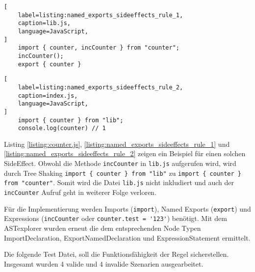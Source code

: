 \begin{lstlisting}[
    label=listing:named_exports_sideeffects_rule_1,
	caption=lib.js,
	language=JavaScript,
]
	import { counter, incCounter } from "counter";
	incCounter();
	export { counter }
\end{lstlisting}

\begin{lstlisting}[
    label=listing:named_exports_sideeffects_rule_2,
	caption=index.js,
	language=JavaScript,
]
	import { counter } from "lib";
	console.log(counter) // 1
\end{lstlisting}

Listing \ref{listing:counter.js}, \ref{listing:named_exports_sideeffects_rule_1} und \ref{listing:named_exports_sideeffects_rule_2} zeigen ein Beispiel für einen solchen SideEffect. Obwohl die Methode \lstinline{incCounter} in \lstinline{lib.js} aufgerufen wird, wird durch Tree Shaking \lstinline|import { counter } from "lib"| zu \lstinline|import { counter } from "counter"|. Somit wird die Datei \lstinline{lib.js} nicht inkludiert und auch der \lstinline{incCounter} Aufruf geht in weiterer Folge verloren.

Für die Implementierung werden Imports (\lstinline{import}), Named Exports  (\lstinline{export}) und Expressions (\lstinline{incCounter} oder \lstinline{counter.test = '123'}) benötigt. Mit dem ASTexplorer wurden erneut die dem entsprechenden Node Typen ImportDeclaration, ExportNamedDeclaration und ExpressionStatement ermittelt.

Die folgende Test Datei, soll die Funktionsfähigkeit der Regel sicherstellen. Insgesamt wurden 4 valide und 4 invalide Szenarien ausgearbeitet.

